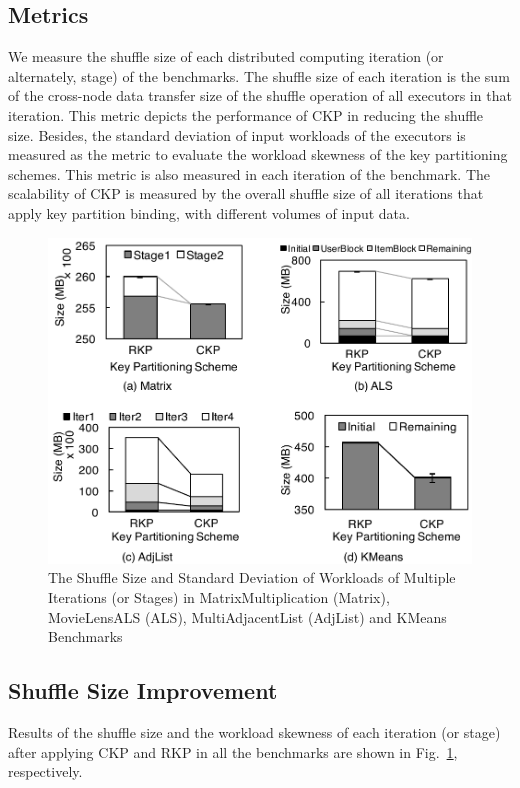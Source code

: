 \documentclass[10pt,journal,compsoc]{IEEEtran}
\begin{document}
\subsection{Metrics}
We measure the shuffle size of each distributed computing iteration (or alternately, stage) of the benchmarks. 
The shuffle size of each iteration is the sum of the cross-node data transfer size of the shuffle operation of all executors in that iteration. 
This metric depicts the performance of CKP in reducing the shuffle size. 
Besides, the standard deviation of input workloads of the executors is measured as the metric to evaluate the workload skewness of the key partitioning schemes. 
This metric is also measured in each iteration of the benchmark. 
The scalability of CKP is measured by the overall shuffle size of all iterations that apply key partition binding, with different volumes of input data. 

\begin{figure}[!t]
\centering
\includegraphics[width=1\columnwidth]{figure5}
\caption{The Shuffle Size and Standard Deviation of Workloads of Multiple Iterations (or Stages) in MatrixMultiplication (Matrix), MovieLensALS (ALS), MultiAdjacentList (AdjList) and KMeans Benchmarks
}
\label{fig:size}
\end{figure}


\subsection{Shuffle Size Improvement} 
Results of the shuffle size and the workload skewness of each iteration (or stage) after applying CKP and RKP in all the benchmarks are shown in Fig.~\ref{fig:size}, respectively. 
\end{document}
